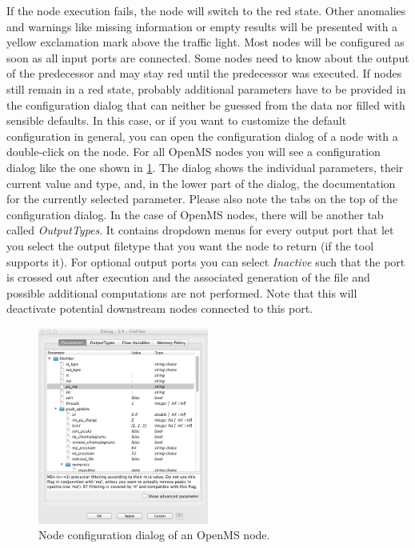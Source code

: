 If the node execution fails, the node will switch to the red state. Other anomalies and warnings like missing information or empty results 
will be presented with a yellow exclamation mark above the traffic light.
Most nodes will be configured as soon as all input ports are connected. Some nodes need to know about the output of the predecessor and may stay red until the predecessor was executed.
If nodes still remain in a red state, probably additional parameters have to be provided in the configuration dialog that can neither be guessed from the data nor filled with sensible defaults.
In this case, or if you want to customize the default configuration in general, you can open the configuration dialog of a node with a double-click on the node.
For all OpenMS nodes you will see a configuration dialog like the one shown in \cref{fig:knime_configure}.
The dialog shows the individual parameters, their current value and type, and, in the lower part of the dialog, the 
documentation for the currently selected parameter. Please also note the tabs on the top of the configuration dialog. 
In the case of OpenMS nodes, there will be another tab called \textit{OutputTypes}. It contains dropdown menus for 
every output port that let you select the output filetype that you want the node to return (if the tool supports 
it). For optional output ports you can select \textit{Inactive} such that the port is crossed out after execution and 
the associated generation of the file and possible additional computations are not performed. Note that this will 
deactivate potential downstream nodes connected to this port.

\begin{figure}
\centering
\includegraphics[width=0.5\textwidth]{graphics/knime_setup/knime_configure_dialog}
\caption{Node configuration dialog of an OpenMS node.}
\label{fig:knime_configure}
\end{figure}


